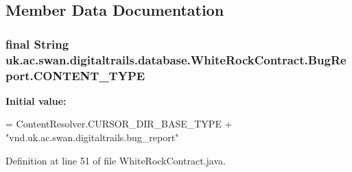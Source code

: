 \subsection{Member Data Documentation}
\hypertarget{classuk_1_1ac_1_1swan_1_1digitaltrails_1_1database_1_1_white_rock_contract_1_1_bug_report_a7ec6511186475b6e50129229ff736ec7}{
\subsubsection[{C\+O\+N\+T\+E\+N\+T\+\_\+\+T\+Y\+P\+E}]{\setlength{\rightskip}{0pt plus 5cm}final String uk.\+ac.\+swan.\+digitaltrails.\+database.\+White\+Rock\+Contract.\+Bug\+Report.\+C\+O\+N\+T\+E\+N\+T\+\_\+\+T\+Y\+P\+E\hspace{0.3cm}{\ttfamily [static]}}}\label{classuk_1_1ac_1_1swan_1_1digitaltrails_1_1database_1_1_white_rock_contract_1_1_bug_report_a7ec6511186475b6e50129229ff736ec7}
{\bfseries Initial value\+:}
\begin{DoxyCode}
= ContentResolver.CURSOR\_DIR\_BASE\_TYPE +
                \textcolor{stringliteral}{"vnd.uk.ac.swan.digitaltrails.bug\_report"}
\end{DoxyCode}


Definition at line 51 of file White\+Rock\+Contract.\+java.

